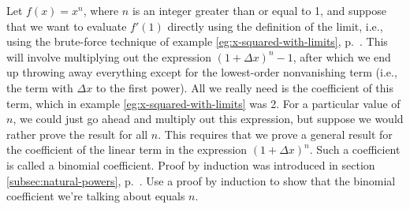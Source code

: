 Let $f(x)=x^n$, where $n$ is an integer greater than or equal to 1,
and suppose that we want to evaluate $f'(1)$ directly using the definition of the limit,
i.e., using the brute-force technique of example \ref{eg:x-squared-with-limits},
p.~\pageref{eg:x-squared-with-limits}. This will involve multiplying out the
expression $(1+\Delta x)^n-1$, after which we end up throwing away everything except for the
lowest-order nonvanishing term (i.e., the term with $\Delta x$ to the first power).
All we really need is the coefficient of this term, which in example
\ref{eg:x-squared-with-limits} was 2.
For a particular value of $n$, we could just go ahead and multiply out this expression, but suppose we would rather
prove the result for all $n$. This requires that we prove a general result for
the coefficient of the linear term in the expression $(1+\Delta x)^n$. Such a coefficient is called
a binomial coefficient. 
Proof by induction was introduced in section \ref{subsec:natural-powers}, p.~\pageref{induction}.
Use a proof by induction to show that the binomial coefficient we're talking about equals $n$.
